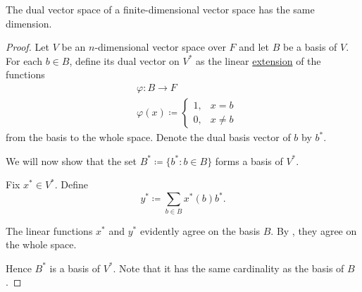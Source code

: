 \begin{proposition}\label{thm:finite_dimensional_dual_space_is_isomorphic}
  The dual vector space of a finite-dimensional vector space has the same dimension.
\end{proposition}
\begin{proof}
  Let \( V \) be an \( n \)-dimensional vector space over \( F \) and let \( B \) be a basis of \( V \). For each \( b \in B \), define its dual vector on \( V^* \) as the linear \hyperref[thm:linear_map_iff_function_on_basis]{extension} of the functions
  \begin{align*}
     & \varphi: B \to F                               \\
     & \varphi(x) \coloneqq \begin{cases}
      1, & x = b    \\
      0, & x \neq b
    \end{cases}
  \end{align*}
  from the basis to the whole space. Denote the dual basis vector of \( b \) by \( b^* \).

  We will now show that the set \( B^* \coloneqq \{ b^* \colon b \in B \} \) forms a basis of \( V^* \).

  Fix \( x^* \in V^* \). Define
  \begin{equation*}
    y^* \coloneqq \sum_{b \in B} x^*(b) b^*.
  \end{equation*}

  The linear functions \( x^* \) and \( y^* \) evidently agree on the basis \( B \). By , they agree on the whole space.

  Hence \( B^* \) is a basis of \( V^* \). Note that it has the same cardinality as the basis of \( B \).
\end{proof}

